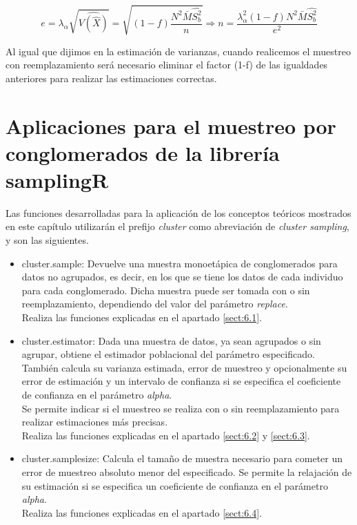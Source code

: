\begin{equation}
    e = \lambda_\alpha\sqrt{\widehat{V(\hat{X})}} = \sqrt{(1-f)\frac{N^2\bar{M}\hat{S_b^2}}{n}} \Rightarrow n = \frac{\lambda_\alpha^2(1-f)N^2\bar{M}\hat{S_b^2}}{e^2}
\end{equation}

Al igual que dijimos en la estimación de varianzas, cuando realicemos el muestreo con reemplazamiento será necesario eliminar el factor (1-f) de las igualdades anteriores para realizar las estimaciones correctas.

\section{Aplicaciones para el muestreo por conglomerados de la librería samplingR}

Las funciones desarrolladas para la aplicación de los conceptos teóricos mostrados en este capítulo utilizarán el prefijo \textit{cluster} como abreviación de \textit{cluster sampling}, y son las siguientes.

\begin{itemize}[label=$\bullet$]
    \item cluster.sample: Devuelve una muestra monoetápica de conglomerados para datos no agrupados, es decir, en los que se tiene los datos de cada individuo para cada conglomerado. Dicha muestra puede ser tomada con o sin reemplazamiento, dependiendo del valor del parámetro \textit{replace}.\\

    Realiza las funciones explicadas en el apartado \ref{sect:6.1}.


    \item cluster.estimator: Dada una muestra de datos, ya sean agrupados o sin agrupar, obtiene el estimador poblacional del parámetro especificado. También calcula su varianza estimada, error de muestreo y opcionalmente su error de estimación y un intervalo de confianza si se especifica el coeficiente de confianza en el parámetro \textit{alpha}. \\

    Se permite indicar si el muestreo se realiza con o sin reemplazamiento para realizar estimaciones más precisas.\\

    Realiza las funciones explicadas en el apartado \ref{sect:6.2} y \ref{sect:6.3}.

    \item cluster.samplesize:  Calcula el tamaño de muestra necesario para cometer un error de muestreo absoluto menor del especificado. Se permite la relajación de su estimación si se especifica un coeficiente de confianza en el parámetro \textit{alpha}.\\
    
    Realiza las funciones explicadas en el apartado \ref{sect:6.4}.
\end{itemize}
